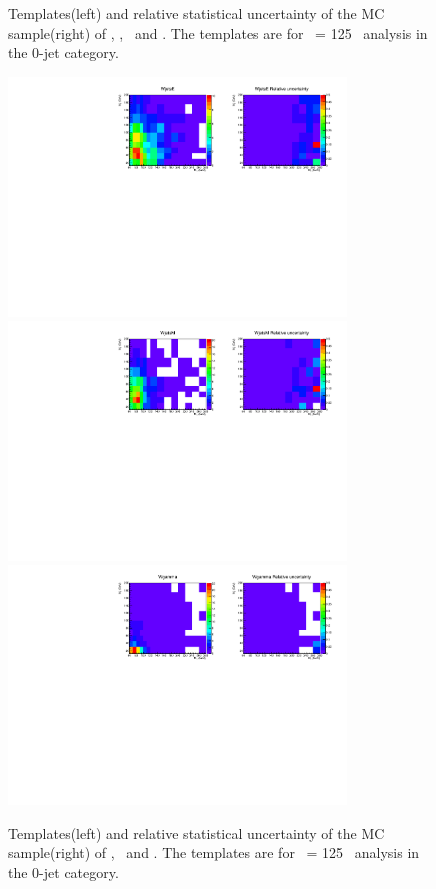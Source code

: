 \begin{figure}[htp]
\caption{Templates(left) and relative statistical uncertainty of the MC sample(right) 
of \qqww, \ggww, \topbkg\ and \vv. 
The templates are for \mHi\ = 125 \GeV\ analysis in the 0-jet category.}
\label{fig:2dtemplate_125_0j_2}
\end{figure}

\begin{figure}[htp]
\centering
\includegraphics[width=0.8\textwidth]{figures/2dtemplate_WjetsE_mH125_0j.pdf}
\includegraphics[width=0.8\textwidth]{figures/2dtemplate_WjetsM_mH125_0j.pdf}
\includegraphics[width=0.8\textwidth]{figures/2dtemplate_Wgamma_mH125_0j.pdf}
\caption{Templates(left) and relative statistical uncertainty of the MC sample(right) 
of \WjetsE, \WjetsM\ and \wgamma. 
The templates are for \mHi\ = 125 \GeV\ analysis in the 0-jet category.}
\label{fig:2dtemplate_125_0j_3}
\end{figure}

